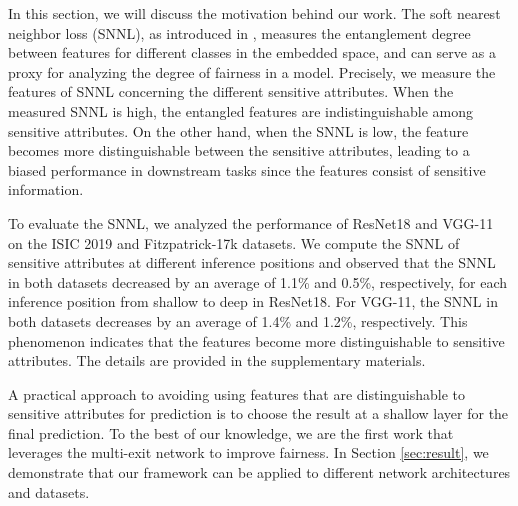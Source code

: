In this section, we will discuss the motivation behind our work. The soft nearest neighbor loss (SNNL), as introduced in \cite{frosst2019analyzing}, measures the entanglement degree between features for different classes in the embedded space, and can serve as a proxy for analyzing the degree of fairness in a model. Precisely, we measure the features of SNNL concerning the different sensitive attributes. When the measured SNNL is high, the entangled features are indistinguishable among sensitive attributes. On the other hand, when the SNNL is low, the feature becomes more distinguishable between the sensitive attributes, leading to a biased performance in downstream tasks since the features consist of sensitive information.

To evaluate the SNNL, we analyzed the performance of ResNet18 \cite{he2016deep} and VGG-11 \cite{simonyan2014very} on the ISIC 2019 and Fitzpatrick-17k datasets. We compute the SNNL of sensitive attributes at different inference positions and observed that the SNNL in both datasets decreased by an average of 1.1\% and 0.5\%, respectively, for each inference position from shallow to deep in ResNet18. For VGG-11, the SNNL in both datasets decreases by an average of 1.4\% and 1.2\%, respectively. This phenomenon indicates that the features become more distinguishable to sensitive attributes. The details are provided in the supplementary materials.


A practical approach to avoiding using features that are distinguishable to sensitive attributes for prediction is to choose the result at a shallow layer for the final prediction. To the best of our knowledge, we are the first work that leverages the multi-exit network to improve fairness. In Section \ref{sec:result}, we demonstrate that our framework can be applied to different network architectures and datasets.


